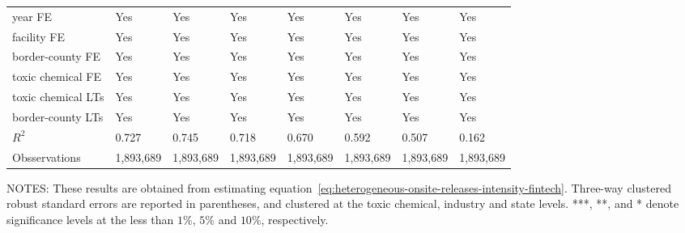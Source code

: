 \begin{table}[H]
{\begin{tabular}{@{}llllllll@{}}
            year FE                         & Yes       & Yes           & Yes       & Yes          & Yes             & Yes           & Yes                 \\
            facility FE                     & Yes       & Yes           & Yes       & Yes          & Yes             & Yes           & Yes                 \\
            border-county FE                & Yes       & Yes           & Yes       & Yes          & Yes             & Yes           & Yes                 \\
            toxic chemical FE               & Yes       & Yes           & Yes       & Yes          & Yes             & Yes           & Yes                 \\
            toxic chemical LTs              & Yes       & Yes           & Yes       & Yes          & Yes             & Yes           & Yes                 \\
            border-county LTs               & Yes       & Yes           & Yes       & Yes          & Yes             & Yes           & Yes                 \\ \midrule
            $R^2$                           & 0.727     & 0.745         & 0.718     & 0.670        & 0.592           & 0.507         & 0.162               \\
            Obsservations                   & 1,893,689 & 1,893,689     & 1,893,689 & 1,893,689    & 1,893,689       & 1,893,689     & 1,893,689           \\ \bottomrule \bottomrule
        \end{tabular}%
    }
    \begin{minipage}{\columnwidth}
        \vspace{0.05in}
        \tiny NOTES: These results are obtained from estimating equation~\ref{eq:heterogeneous-onsite-releases-intensity-fintech}. Three-way clustered robust standard errors are reported in parentheses, and clustered at the toxic chemical, industry and state levels. ***, **, and * denote significance levels at the less than $1\%$, $5\%$ and $10\%$, respectively.
    \end{minipage}
\end{table}